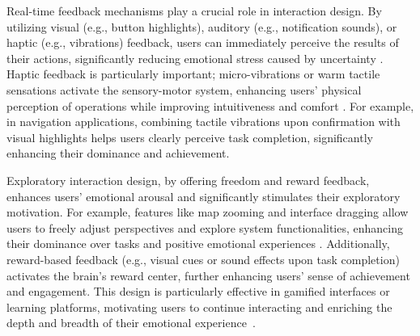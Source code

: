 Real-time feedback mechanisms play a crucial role in interaction design. By utilizing visual (e.g., button highlights), auditory (e.g., notification sounds), or haptic (e.g., vibrations) feedback, users can immediately perceive the results of their actions, significantly reducing emotional stress caused by uncertainty \cite{wang2024enhancing}. Haptic feedback is particularly important; micro-vibrations or warm tactile sensations activate the sensory-motor system, enhancing users’ physical perception of operations while improving intuitiveness and comfort \cite{olugbade2023touch}. For example, in navigation applications, combining tactile vibrations upon confirmation with visual highlights helps users clearly perceive task completion, significantly enhancing their dominance and achievement.

Exploratory interaction design, by offering freedom and reward feedback, enhances users’ emotional arousal and significantly stimulates their exploratory motivation. For example, features like map zooming and interface dragging allow users to freely adjust perspectives and explore system functionalities, enhancing their dominance over tasks and positive emotional experiences \cite{amoor2014designing}. Additionally, reward-based feedback (e.g., visual cues or sound effects upon task completion) activates the brain’s reward center, further enhancing users’ sense of achievement and engagement. This design is particularly effective in gamified interfaces or learning platforms, motivating users to continue interacting and enriching the depth and breadth of their emotional experience~\cite{wang2024enhancing}.

